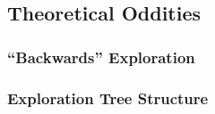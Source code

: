 \subsection{Theoretical Oddities}
\label{sec:future-theory}

\subsubsection{``Backwards'' Exploration}
\label{sec:future-backwards}

\subsubsection{Exploration Tree Structure}
